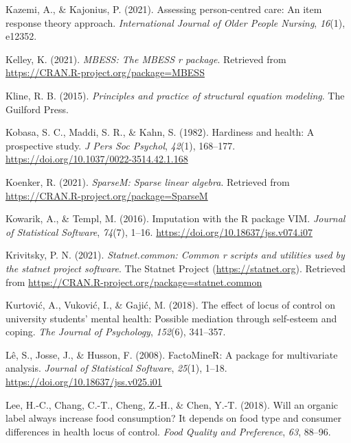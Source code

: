 \documentclass[
  english,
  man]{apa6}
\newlength{\cslhangindent}
\newlength{\cslentryspacingunit} %
\newenvironment{CSLReferences}[2] %
 {%
  \setlength{\parindent}{0pt}
  \ifodd #1
  \let\oldpar\par
  \def\par{\hangindent=\cslhangindent\oldpar}
  \fi
  \setlength{\parskip}{#2\cslentryspacingunit}
 }%
 {}
\begin{document}
\begin{CSLReferences}{1}{0}
\leavevmode{}%
Kazemi, A., \& Kajonius, P. (2021). Assessing person-centred care: An item response theory approach. \emph{International Journal of Older People Nursing}, \emph{16}(1), e12352.

\leavevmode{}%
Kelley, K. (2021). \emph{MBESS: The MBESS r package}. Retrieved from \url{https://CRAN.R-project.org/package=MBESS}

\leavevmode{}%
Kline, R. B. (2015). \emph{Principles and practice of structural equation modeling}. The Guilford Press.

\leavevmode{}%
Kobasa, S. C., Maddi, S. R., \& Kahn, S. (1982). Hardiness and health: A prospective study. \emph{J Pers Soc Psychol}, \emph{42}(1), 168--177. \url{https://doi.org/10.1037/0022-3514.42.1.168}

\leavevmode{}%
Koenker, R. (2021). \emph{SparseM: Sparse linear algebra}. Retrieved from \url{https://CRAN.R-project.org/package=SparseM}

\leavevmode{}%
Kowarik, A., \& Templ, M. (2016). Imputation with the {R} package {VIM}. \emph{Journal of Statistical Software}, \emph{74}(7), 1--16. \url{https://doi.org/10.18637/jss.v074.i07}

\leavevmode{}%
Krivitsky, P. N. (2021). \emph{Statnet.common: Common r scripts and utilities used by the statnet project software}. The Statnet Project (\url{https://statnet.org}). Retrieved from \url{https://CRAN.R-project.org/package=statnet.common}

\leavevmode{}%
Kurtović, A., Vuković, I., \& Gajić, M. (2018). The effect of locus of control on university students' mental health: Possible mediation through self-esteem and coping. \emph{The Journal of Psychology}, \emph{152}(6), 341--357.

\leavevmode{}%
Lê, S., Josse, J., \& Husson, F. (2008). {FactoMineR}: A package for multivariate analysis. \emph{Journal of Statistical Software}, \emph{25}(1), 1--18. \url{https://doi.org/10.18637/jss.v025.i01}

\leavevmode{}%
Lee, H.-C., Chang, C.-T., Cheng, Z.-H., \& Chen, Y.-T. (2018). Will an organic label always increase food consumption? It depends on food type and consumer differences in health locus of control. \emph{Food Quality and Preference}, \emph{63}, 88--96.


\end{CSLReferences}
\end{document}
